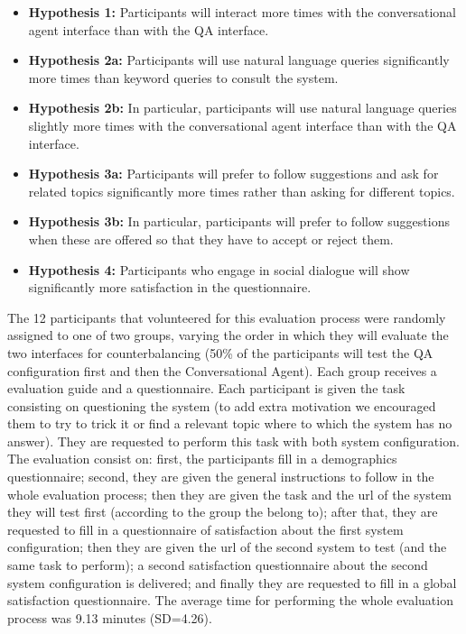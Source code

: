 \begin{itemize}
  \item \textbf{Hypothesis 1:} Participants will interact more times with the conversational agent interface than with the \ac{QA} interface.    
  \item \textbf{Hypothesis 2a:} Participants will use natural language queries significantly more times than keyword queries to consult the system.
  \item \textbf{Hypothesis 2b:} In particular, participants will use natural language queries slightly more times with the conversational agent interface than with the \ac{QA} interface.
  \item \textbf{Hypothesis 3a:} Participants will prefer to follow suggestions and ask for related topics significantly more times rather than asking for different topics.
  \item \textbf{Hypothesis 3b:} In particular, participants will prefer to follow suggestions when these are offered so that they have to accept or reject them.
  \item \textbf{Hypothesis 4:} Participants who engage in social dialogue will show significantly more satisfaction in the questionnaire.  
\end{itemize}

The 12 participants that volunteered for this evaluation process were randomly assigned to one of two groups, varying the order in which they will evaluate the two interfaces for counterbalancing (50\% of the participants will test the \ac{QA} configuration first and then the Conversational Agent). Each group receives a evaluation guide and a questionnaire. Each participant is given the task consisting on questioning the system (to add extra motivation we encouraged them to try to trick it or find a relevant topic where to which the system has no answer). They are requested to perform this task with both system configuration.
The evaluation consist on: first, the participants fill in a demographics questionnaire; second, they are given the general instructions to follow in the whole evaluation process; then they are given the task and the url of the system they will test first (according to the group the belong to); after that, they are requested to fill in a questionnaire of satisfaction about the first system configuration; then they are given the url of the second system to test (and the same task to perform); a second satisfaction questionnaire about the second system configuration is delivered; and finally they are requested to fill in a global satisfaction questionnaire. The average time for performing the whole evaluation process was 9.13 minutes (SD=4.26).

